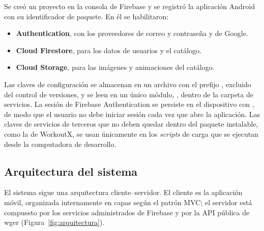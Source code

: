 Se creó un proyecto en la consola de Firebase y se registró la aplicación
Android con su identificador de paquete. En él se habilitaron:

\begin{itemize}
    \item \textbf{Authentication}, con los proveedores de correo y contraseña
    y de Google.
    \item \textbf{Cloud Firestore}, para los datos de usuarios y el catálogo.
    \item \textbf{Cloud Storage}, para las imágenes y animaciones del catálogo.
\end{itemize}

Las claves de configuración se almacenan en un archivo  con el
prefijo , excluido del control de versiones, y se leen
en un único módulo, , dentro de la carpeta de servicios. La sesión de
Firebase Authentication se persiste en el dispositivo con
, de modo que el usuario no debe iniciar sesión cada vez
que abre la aplicación. Las claves de servicios de terceros que no deben
quedar dentro del paquete instalable, como la de WorkoutX, se usan únicamente
en los \emph{scripts} de carga que se ejecutan desde la computadora de
desarrollo.

\subsection{Arquitectura del sistema}
\label{subsec:arquitectura}

El sistema sigue una arquitectura cliente--servidor. El cliente es la
aplicación móvil, organizada internamente en capas según el patrón MVC; el
servidor está compuesto por los servicios administrados de Firebase y por la
API pública de wger (Figura~\ref{fig:arquitectura}).

